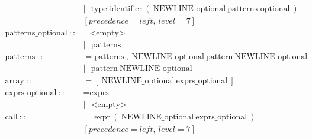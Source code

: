 \documentclass[a4paper,12pt]{book} %
\begin{document}
\begin{align*}
                                      & |\ \ \ \text{type\_identifier}\ (\ \text{NEWLINE\_optional}\ \text{patterns\_optional}\ ) \\ & [precedence=left,\ level=7]                                                                                                  \\
  \text{patterns\_optional}\ ::       & = \text{<empty>}                                                                                                                                                                                                          \\
                                      & |\ \ \ \text{patterns}                                                                                                                                                                                                    \\
  \text{patterns}\ ::                 & = \text{patterns}\ ,\ \text{NEWLINE\_optional}\ \text{pattern}\ \text{NEWLINE\_optional}                                                                                                                                  \\
                                      & |\ \ \ \text{pattern}\ \text{NEWLINE\_optional}                                                                                                                                                                           \\
  \text{array}\ ::                    & = [\ \text{NEWLINE\_optional}\ \text{exprs\_optional}\ ]                                                                                                                                                                  \\
  \text{exprs\_optional}\ ::          & = \text{exprs}                                                                                                                                                                                                            \\
                                      & |\ \ \ \text{<empty>}                                                                                                                                                                                                     \\
  \text{call}\ ::                     & = \text{expr}\ (\ \text{NEWLINE\_optional}\ \text{exprs\_optional}\ )\\ & [precedence=left,\ level=7]                                                                                                                      \\

\end{align*}
\end{document}
